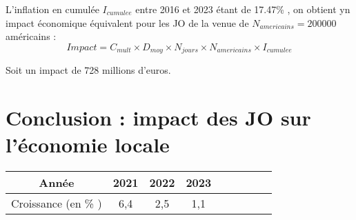 \documentclass{article}
\begin{document}
  L'inflation en cumulée $I_{cumulee}$ entre 2016 et 2023 étant de 17.47\% , on obtient yn impact économique équivalent pour les JO de la venue de $N_{americains} = 200 000$ américains :
  $$ Impact = C_{mult} \times D_{moy} \times N_{jours} \times N_{americains} \times I_{cumulee}$$

  Soit un impact de 728 millions d'euros.
\section{Conclusion : impact des JO sur l'économie locale}

\begin{center}
    \begin{tabular}{ | c | c | c |  c |  c |  c |  c |  c |  c | }
      \hline
      Année & 2021 & 2022 & 2023  \\ \hline
      Croissance (en \% ) & 6,4 & 2,5 & 1,1  \\ \hline
    \end{tabular}
\end{center}
\end{document}
